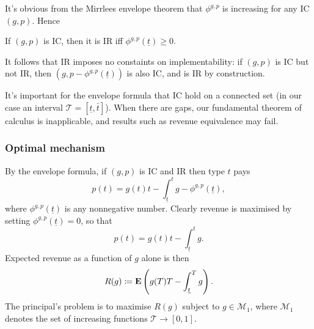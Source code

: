 \documentclass[11pt,letterpaper,reqno,oneside]{article}
\begin{document}
It's obvious from the Mirrlees envelope theorem that $\phi^{g,p}$ is increasing for any IC $(g,p)$. Hence
%
\begin{corollary}
	If $(g,p)$ is IC, then it is IR iff $\phi^{g,p}(\underline{t}) \geq 0$.
\end{corollary}
%
\noindent It follows that IR imposes no constaints on implementability: if $(g,p)$ is IC but not IR, then $(g,p - \phi^{g,p}(\underline{t}))$ is also IC, and is IR by construction.


\begin{remark}
	It's important for the envelope formula that IC hold on a connected set (in our case an interval $\mathcal{T} = \left[ \underline{t}, \bar{t} \right]$). When there are gaps, our fundamental theorem of calculus is inapplicable, and results such as revenue equivalence may fail.
\end{remark}



\subsubsection{Optimal mechanism}
\label{sec:mech_desi:single_agent_one_dimension:revenue-maxing_mech_sing}

By the envelope formula, if $(g,p)$ is IC and IR then type $t$ pays
%
\begin{equation*}
	p(t) = g(t) t - \int_{\underline{t}}^t g
	- \phi^{g,p}\left( \underline{t} \right) ,
\end{equation*}
%
where $\phi^{g,p}\left( \underline{t} \right)$ is any nonnegative number. Clearly revenue is maximised by setting $\phi^{g,p}\left( \underline{t} \right) = 0$, so that
%
\begin{equation}
	\label{eq:optimal_p_form}
	p(t) = g(t) t - \int_{\underline{t}}^t g .
\end{equation}
%
Expected revenue as a function of $g$ alone is then
%
\begin{equation*}
	R(g) 
	\coloneqq \mathbf{E}\left( g(T) T 
	- \int_{\underline{t}}^T g \right)  .
\end{equation*}
%
The principal's problem is to maximise $R(g)$ subject to $g \in \mathcal{M}_1$, where $\mathcal{M}_1$ denotes the set of increasing functions $\mathcal{T} \to [0,1]$.
\end{document}
